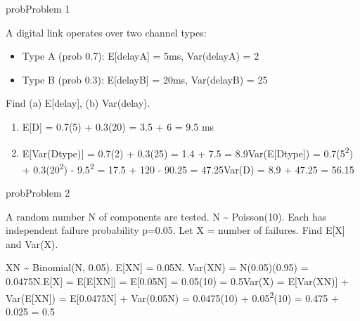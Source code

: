 \begin{PSbox}[unbreakable]{prob}{Problem 1}

A digital link operates over two channel types:

\begin{itemize}
\tightlist
\item
  Type A (prob 0.7): E[delay\textbar{}A] = 5ms, Var(delay\textbar{}A) = 2
\item
  Type B (prob 0.3): E[delay\textbar{}B] = 20ms, Var(delay\textbar{}B) = 25
\end{itemize}

Find (a) E[delay], (b) Var(delay).

\PSsolution{} 

\begin{enumerate}
\def\labelenumi{(\alph{enumi})}
\tightlist
\item
  E[D] = 0.7(5) + 0.3(20) = 3.5 + 6 = 9.5 ms
\item
  E[Var(D\textbar{}type)] = 0.7(2) + 0.3(25) = 1.4 + 7.5 = 8.9\PSbr{}Var(E[D\textbar{}type]) = 0.7(5\textsuperscript{2}) + 0.3(20\textsuperscript{2}) - 9.5\textsuperscript{2} = 17.5 + 120 - 90.25 = 47.25\PSbr{}Var(D) = 8.9 + 47.25 = 56.15
\end{enumerate}

\end{PSbox}

\begin{PSbox}[unbreakable]{prob}{Problem 2}

A random number N of components are tested. N \textasciitilde{} Poisson(10). Each has independent failure probability p=0.05. Let X = number of failures. Find E[X] and Var(X).

\PSsolution{} X\textbar{}N \textasciitilde{} Binomial(N, 0.05). E[X\textbar{}N] = 0.05N. Var(X\textbar{}N) = N(0.05)(0.95) = 0.0475N.\PSbr{}E[X] = E[E[X\textbar{}N]] = E[0.05N] = 0.05(10) = 0.5\PSbr{}Var(X) = E[Var(X\textbar{}N)] + Var(E[X\textbar{}N]) = E[0.0475N] + Var(0.05N) = 0.0475(10) + 0.05\textsuperscript{2}(10) = 0.475 + 0.025 = 0.5

\end{PSbox}

